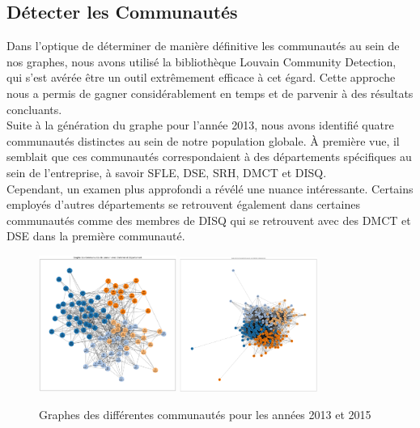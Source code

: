 \documentclass{article}
\begin{document}
\subsection{Détecter les Communautés}

Dans l'optique de déterminer de manière définitive les communautés au sein de nos graphes, nous avons utilisé la bibliothèque Louvain Community Detection, qui s'est avérée être un outil extrêmement efficace à cet égard. Cette approche nous a permis de gagner considérablement en temps et de parvenir à des résultats concluants. \\

Suite à la génération du graphe pour l'année 2013, nous avons identifié quatre communautés distinctes au sein de notre population globale. À première vue, il semblait que ces communautés correspondaient à des départements spécifiques au sein de l'entreprise, à savoir SFLE, DSE, SRH, DMCT et DISQ. \\

Cependant, un examen plus approfondi a révélé une nuance intéressante. Certains employés d'autres départements se retrouvent également dans certaines communautés comme des membres de DISQ qui se retrouvent avec des DMCT et DSE dans la première communauté.


\begin{figure}[!h]
    \centering
    \includegraphics[width=0.40\textwidth]{assets/communaute/communaute_2013.png}
    \hfill
    \includegraphics[width=0.40\textwidth]{assets/communaute/communaute_2015.png}
    \caption{Graphes des différentes communautés pour les années 2013 et 2015}
    \label{fig:communaute_parallel}
\end{figure}
\end{document}

